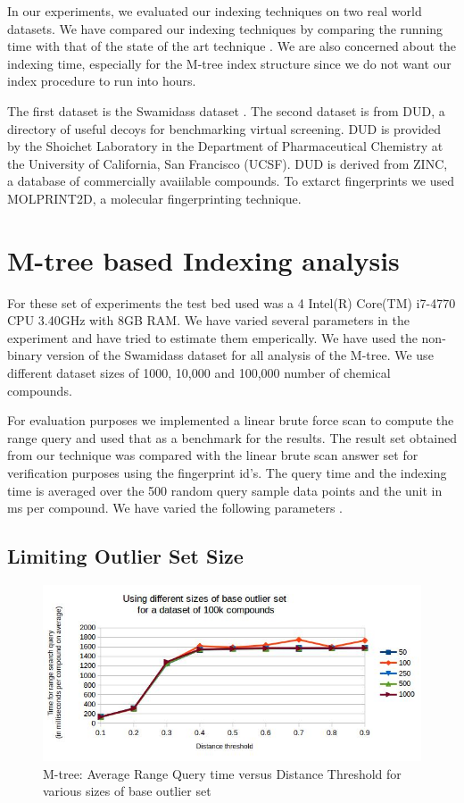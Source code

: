 
In our experiments, we evaluated our indexing techniques on two real world datasets. We have compared our indexing techniques by comparing the running time with that of the state of the art technique  . We are also concerned about the indexing time, especially for the M-tree index structure since we do not want our index procedure to run into hours.

The first dataset is the Swamidass dataset . The second dataset is from DUD, a directory of useful decoys for benchmarking virtual screening. DUD is provided by the Shoichet Laboratory in the Department of Pharmaceutical Chemistry at the University of California, San Francisco (UCSF). DUD is derived from ZINC, a database of commercially avaiilable compounds. To extarct fingerprints we used MOLPRINT2D, a molecular fingerprinting technique.


\section{M-tree based Indexing analysis}	

For these set of experiments the test bed used was a 4 Intel(R) Core(TM) i7-4770 CPU \@ 3.40GHz with 8GB RAM. We have varied several parameters in the experiment and have tried to estimate them emperically. We have used the non-binary version of the Swamidass dataset for all analysis of the M-tree. We use different dataset sizes of 1000, 10,000 and 100,000 number of chemical compounds.

For evaluation purposes we implemented a linear brute force scan to compute the range query and used that as a benchmark for the results. The result set obtained from our technique was compared with the linear brute scan answer set for verification purposes using the fingerprint id's. The query time and the indexing time is averaged over the 500 random query sample data points and the unit in ms per compound. We have varied the following parameters .


\subsection{Limiting Outlier Set Size }

\begin{figure}[ht]	
\centering
\includegraphics[width=1 \columnwidth]{img/image1.jpg}
\caption{M-tree: Average Range Query time versus Distance Threshold for various sizes of base outlier set}
\label{fig:5.1}
\end{figure}

